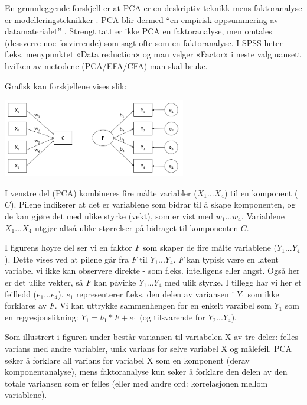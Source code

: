 \documentclass[
]{article}
\begin{document}
En grunnleggende forskjell er at PCA er en deskriptiv teknikk mens faktoranalyse er modelleringsteknikker \citep{unkelSimultaneousParameterEstimation2010}. PCA blir dermed ``en empirisk oppsummering av datamaterialet'' \citep[s.225]{bjerkanFaktoranalyse2007b}.
Strengt tatt er ikke PCA en faktoranalyse, men omtales (dessverre noe forvirrende) som sagt ofte som en faktoranalyse. I SPSS heter f.eks. menypunktet «Data reduction» og man velger «Factor» i neste valg uansett hvilken av metodene (PCA/EFA/CFA) man skal bruke.

Grafisk kan forskjellene vises slik:

\includegraphics[width=0.6\textwidth,height=\textheight]{PCA-FA.png}

I venstre del (PCA) kombineres fire målte variabler (\(X_1...X_4\)) til en komponent (\(C\)). Pilene indikerer at det er variablene som bidrar til å skape komponenten, og de kan gjøre det med ulike styrke (vekt), som er vist med \(w_1...w_4\). Variablene \(X_1...X_4\) utgjør altså ulike størrelser på bidraget til komponenten \(C\).

I figurens høyre del ser vi en faktor \(F\) som skaper de fire målte variablene (\(Y_1...Y_4\)). Dette vises ved at pilene går fra \(F\) til \(Y_1...Y_4\). \(F\) kan typisk være en latent variabel vi ikke kan observere direkte - som f.eks. intelligens eller angst. Også her er det ulike vekter, så \(F\) kan påvirke \(Y_1...Y_4\) med ulik styrke. I tillegg har vi her et feilledd (\(e_1...e_4\)). \(e_1\) representerer f.eks. den delen av variansen i \(Y_1\) som ikke forklares av \(F\). Vi kan uttrykke sammenhengen for en enkelt varaibel som \(Y_1\) som en regresjonslikning: \(Y_1 = b_1*F + e_1\) (og tilsvarende for \(Y_2...Y_4\)).

Som illustrert i figuren under består variansen til variabelen X av tre deler: felles varians med andre variabler, unik varians for selve variabel X og målefeil. PCA søker å forklare all varians for variabel X som en komponent (derav komponentanalyse), mens faktoranalyse kun søker å forklare den delen av den totale variansen som er felles (eller med andre ord: korrelasjonen mellom variablene).
\end{document}
